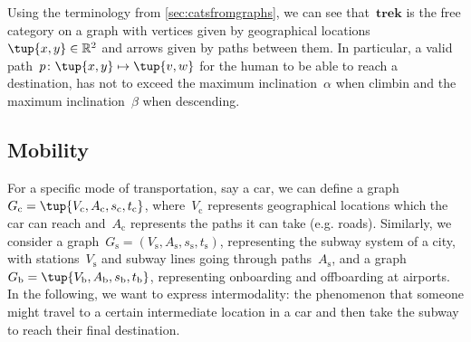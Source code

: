 {Using the terminology from \cref{sec:catsfromgraphs}, we can see that~$\mathbf{trek}$ is the free category on a graph with vertices given by geographical locations~$\tup{x,y}\in \mathbb{R}^2$ and arrows given by paths between them. In particular, a valid path~$p\colon \tup{x,y}\mapsto \tup{v,w}$ for the human to be able to reach a destination, has not to exceed the maximum inclination~$\alpha$ when climbin and the maximum inclination~$\beta$ when descending.
}

\subsection{Mobility}

For a specific mode of transportation, say a car, we can define a graph~$G_\mathrm{c}=\tup{V_\mathrm{c},A_\mathrm{c},s_\mathrm{c},t_\mathrm{c}}$, where~$V_\mathrm{c}$ represents geographical locations which the car can reach and~$A_\mathrm{c}$ represents the paths it can take (e.g. roads). Similarly, we consider a graph~$G_\mathrm{s}=(V_\mathrm{s},A_\mathrm{s},s_\mathrm{s},t_\mathrm{s})$, representing the subway system of a city, with stations~$V_\mathrm{s}$ and subway lines going through paths~$A_\mathrm{s}$, and a graph $G_\mathrm{b}=\tup{V_\mathrm{b},A_\mathrm{b},s_\mathrm{b},t_\mathrm{b}}$, representing onboarding and offboarding at airports. In the following, we want to express intermodality: the phenomenon that someone might travel to a certain intermediate location in a car and then take the subway to reach their final destination.

